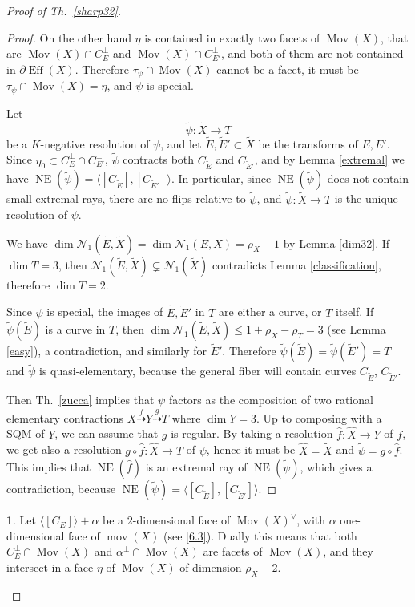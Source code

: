 \documentclass[a4paper,12pt]{amsart}
\theoremstyle{definition}
\newtheorem{prg}[thm]{}
\numberwithin{figure}{section}
\numberwithin{table}{section}
\newcommand{\w}{\widetilde}
\newcommand{\la}{\longrightarrow}
\newcommand{\wi}{\widehat}
\newcommand{\N}{\mathcal{N}_1}
\newcommand{\NE}{\operatorname{NE}}
\newcommand{\Eff}{\operatorname{Eff}}
\newcommand{\Mov}{\operatorname{Mov}}
\newcommand{\mov}{\operatorname{mov}}
\begin{document}
\begin{proof}[Proof of Th.~\ref{sharp32}]
\begin{proof}
 On the other hand $\eta$ is contained in exactly two facets of $\Mov(X)$, that are
  $\Mov(X)\cap C_{E}^{\perp}$ and $\Mov(X)\cap C_{E'}^{\perp}$, and both of them are not contained in $\partial \Eff(X)$.  Therefore $\tau_{\psi}\cap\Mov(X)$ cannot be a facet, it must be
 $\tau_{\psi}\cap\Mov(X)=\eta$, and $\psi$ is special.

 Let
$$\tilde{\psi}\colon\w{X}\la T$$
be a $K$-negative resolution of $\psi$, and let $\w{E},\w{E}'\subset\w{X}$ be the transforms of $E,E'$. Since $\eta_0\subset C_E^{\perp}\cap C_{E'}^{\perp}$, $\tilde{\psi}$ contracts both $C_{\w{E}}$ and $C_{\w{E}'}$, and by Lemma \ref{extremal} we have $\NE(\tilde{\psi})=\langle [C_{\w{E}}],[C_{\w{E}'}] \rangle$. In particular, since $\NE(\tilde{\psi})$ does not contain small extremal rays, there are no flips relative to $\tilde{\psi}$, and $\tilde{\psi}\colon\w{X}\to T$ is the unique resolution of $\psi$.

 We have $\dim\N(\w{E},\w{X})=\dim\N(E,X)=\rho_X-1$ by Lemma \ref{dim32}.
If $\dim T=3$, then $\N(\w{E},\w{X})\subsetneq\N(\w{X})$ contradicts Lemma \ref{classification}, therefore
$\dim T=2$.

Since $\psi$ is special, the images of $\w{E},\w{E}'$ in $T$ are either a curve, or $T$ itself. 
If  $\tilde{\psi}(\w{E})$ is a curve in $T$, then  $\dim\N(\w{E},\w{X})\leq 1+\rho_X-\rho_T=3$ (see Lemma \ref{easy}),  a contradiction, and
 similarly for $\w{E}'$. Therefore $\tilde{\psi}(\w{E})=\tilde{\psi}(\w{E}')=T$  and 
 $\tilde{\psi}$ is quasi-elementary, because the general fiber will contain curves $C_{\w{E}}$, $C_{\w{E}'}$.

 Then  Th.~\ref{zucca} implies that
 $\psi$ factors as the composition of two rational elementary contractions $X\stackrel{f}{\dasharrow}Y\stackrel{g}{\dasharrow} T$
 where $\dim Y=3$. Up to composing with a SQM of $Y$, we can assume that $g$ is regular. 
 By taking a resolution $\hat{f}\colon\wi{X}\to Y$ of $f$, we get also a resolution $g\circ\hat{f}\colon\wi{X}\to T$ of $\psi$, hence it must be $\wi{X}=\w{X}$ and $\tilde{\psi}=g\circ\hat{f}$. This implies that $\NE(\hat{f})$ is an extremal ray of $\NE(\tilde{\psi})$, which 
 gives a contradiction, because  $\NE(\tilde{\psi})=\langle [C_{\w{E}}],[C_{\w{E}'}] \rangle$.
\end{proof}
\begin{prg}
Let $\langle[C_E]\rangle+\alpha$ be a $2$-dimensional face  of $\Mov(X)^{\vee}$, with $\alpha$ one-dimensional face of $\mov(X)$ (see \ref{6.3}).
 Dually this means that both $C_E^{\perp}\cap\Mov(X)$ and $\alpha^{\perp}\cap\Mov(X)$ are facets of $\Mov(X)$, and they intersect in a face $\eta$ of $\Mov(X)$ of dimension $\rho_X-2$.


\end{prg}
\end{proof}
\end{document}
